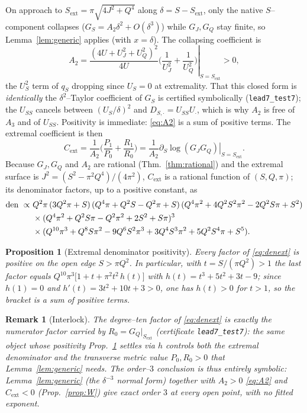 \documentclass[11pt]{article}
\newtheorem{proposition}[theorem]{Proposition}
\newtheorem{remark}[theorem]{Remark}
\newcommand{\Rext}{C_{\mathrm{ext}}}
\newcommand{\Sext}{S_{\mathrm{ext}}}
\begin{document}
On approach to $\Sext=\pi\sqrt{4J^2+Q^4}$ along $\delta=S-\Sext$, only the native $S$--component
collapses ($G_S=A_2\delta^2+O(\delta^3)$) while $G_J,G_Q$ stay finite, so
Lemma~\ref{lem:generic} applies (with $x=\delta$). The collapsing coefficient is
\begin{equation}
A_2=\left.\frac{(4U+U_J^2+U_Q^2)^2}{4U}\Big(\frac1{U_J^2}+\frac1{U_Q^2}\Big)\right|_{S=\Sext}>0,
\label{eq:A2}
\end{equation}
the $U_S^2$ term of $q_S$ dropping since $U_S=0$ at extremality. That this closed form is
\emph{identically} the $\delta^2$--Taylor coefficient of $G_S$ is certified symbolically
(\texttt{lead7\_test7}); the $U_{SS}$ cancels between $(U_S/\delta)^2$ and
$D_{S,\cdot}=U_{SS}U_\cdot$, which is why $A_2$ is free of $A_3$ and of $U_{SS}$. Positivity is
immediate: \eqref{eq:A2} is a sum of positive terms. The extremal coefficient is then
\begin{equation}
\Rext=\frac1{A_2}\Big(\frac{P_1}{P_0}+\frac{R_1}{R_0}\Big)
=\frac1{A_2}\left.\partial_S\log(G_JG_Q)\right|_{S=\Sext}.
\label{eq:Cext}
\end{equation}
Because $G_J,G_Q$ and $A_2$ are rational (Thm.~\ref{thm:rational}) and the extremal surface is
$J^2=(S^2-\pi^2Q^4)/(4\pi^2)$, $\Rext$ is a rational function of $(S,Q,\pi)$; its denominator
factors, up to a positive constant, as
\begin{align}
\mathrm{den}\ \propto\ &Q^2\pi\,(3Q^2\pi+S)\,(Q^4\pi+Q^2S-Q^2\pi+S)\,
(Q^4\pi^2+4Q^2S^2\pi^2-2Q^2S\pi+S^2)\notag\\
&\times(Q^4\pi^2+Q^2S\pi-Q^2\pi^2+2S^2+S\pi)^3\notag\\
&\times(Q^{10}\pi^3+Q^8S\pi^2-9Q^6S^2\pi^3+3Q^4S^3\pi^2+5Q^2S^4\pi+S^5).
\label{eq:denext}
\end{align}

\begin{proposition}[Extremal denominator positivity]
\label{prop:denpos}
Every factor of \eqref{eq:denext} is positive on the open edge $S>\pi Q^2$. In particular, with
$t=S/(\pi Q^2)>1$ the last factor equals $Q^{10}\pi^3\big[1+t+\pi^2t^2\,h(t)\big]$ with
$h(t)=t^3+5t^2+3t-9$; since $h(1)=0$ and $h'(t)=3t^2+10t+3>0$, one has $h(t)>0$ for $t>1$, so
the bracket is a sum of positive terms.
\end{proposition}

\begin{remark}[Interlock]
\label{rem:interlock}
The degree--ten factor of \eqref{eq:denext} is exactly the numerator factor carried by
$R_0=G_Q|_{\Sext}$ (certificate \texttt{lead7\_test7}): the same object whose positivity
Prop.~\ref{prop:denpos} settles via $h$ controls both the extremal denominator and the transverse
metric value $P_0,R_0>0$ that Lemma~\ref{lem:generic} needs. The order--$3$ conclusion is thus
entirely symbolic: Lemma~\ref{lem:generic} (the $\delta^{-3}$ normal form) together with
$A_2>0$ \eqref{eq:A2} and $\Rext<0$ (Prop.~\ref{prop:W}) give exact order $3$ at every open
point, with no fitted exponent.
\end{remark}
\end{document}
